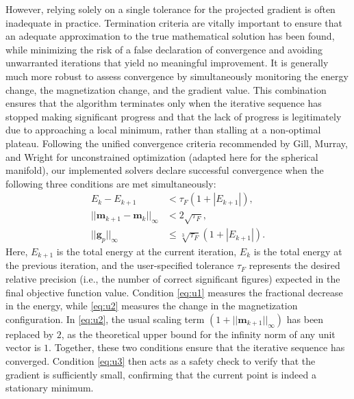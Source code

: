 \documentclass[10pt, a4paper, twocolumn]{article}
\begin{document}
However, relying solely on a single tolerance for the projected gradient is often inadequate in practice. Termination criteria are vitally important to ensure that an adequate approximation to the true mathematical solution has been found, while minimizing the risk of a false declaration of convergence and avoiding unwarranted iterations that yield no meaningful improvement. It is generally much more robust to assess convergence by simultaneously monitoring the energy change, the magnetization change, and the gradient value. This combination ensures that the algorithm terminates only when the iterative sequence has stopped making significant progress and that the lack of progress is legitimately due to approaching a local minimum, rather than stalling at a non-optimal plateau. Following the unified convergence criteria recommended by Gill, Murray, and Wright \cite{GillMurray1981} for unconstrained optimization (adapted here for the spherical manifold), our implemented solvers declare successful convergence when the following three conditions are met simultaneously:
\begin{align}
    E_{k} - E_{k+1} &< \tau_F (1 + |E_{k+1}|), \label{eq:u1} \\
    || \mathbf{m}_{k+1} - \mathbf{m}_{k} ||_\infty &< 2\sqrt{\tau_F}, \label{eq:u2} \\
    || \mathbf{g}_p ||_\infty &\le \sqrt[3]{\tau_F} (1 + |E_{k+1}|). \label{eq:u3}
\end{align}
Here, $E_{k+1}$ is the total energy at the current iteration, $E_k$ is the total energy at the previous iteration, and the user-specified tolerance $\tau_F$ represents the desired relative precision (i.e., the number of correct significant figures) expected in the final objective function value. Condition \eqref{eq:u1} measures the fractional decrease in the energy, while \eqref{eq:u2} measures the change in the magnetization configuration. In \eqref{eq:u2}, the usual scaling term $(1 + ||\mathbf{m}_{k+1}||_\infty)$ has been replaced by $2$, as the theoretical upper bound for the infinity norm of any unit vector is $1$. Together, these two conditions ensure that the iterative sequence has converged. Condition \eqref{eq:u3} then acts as a safety check to verify that the gradient is sufficiently small, confirming that the current point is indeed a stationary minimum.
\end{document}
